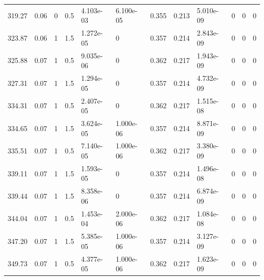 \documentclass[preview]{standalone}
\begin{document}
{{{\begin{tabular}{L{1.2cm}C{1.2cm} C{0.3cm}C{0.5cm} C{1.4cm}C{1.4cm} C{1.4cm}C{1.4cm} C{1.6cm}C{1.6cm} C{1.6cm}C{1.6cm}}
  319.27  &  0.06  & 0     & 0.5 &  4.103e-03  & 6.100e-05  &  0.355&   0.213& 5.010e-09 & 0   &  0 & 0  \\ 
  323.87  &  0.06  & 1     & 1.5 &  1.272e-05  & 0  &  0.357&   0.214& 2.843e-09 & 0   &  0 & 0  \\ 
  325.88  &  0.07  & 1     & 0.5 &  9.035e-06  & 0  &  0.362&   0.217& 1.943e-09 & 0   &  0 & 0  \\ 
  327.31  &  0.07  & 1     & 1.5 &  1.294e-05  & 0  &  0.357&   0.214& 4.732e-09 & 0   &  0 & 0  \\ 
  334.31  &  0.07  & 1     & 0.5 &  2.407e-05  & 0  &  0.362&   0.217& 1.515e-08 & 0   &  0 & 0  \\ 
  334.65  &  0.07  & 1     & 1.5 &  3.624e-05  & 1.000e-06  &  0.357&   0.214& 8.871e-09 & 0   &  0 & 0  \\ 
  335.51  &  0.07  & 1     & 0.5 &  7.140e-05  & 1.000e-06  &  0.362&   0.217& 3.380e-09 & 0   &  0 & 0  \\ 
  339.11  &  0.07  & 1     & 1.5 &  1.593e-05  & 0  &  0.357&   0.214& 1.496e-08 & 0   &  0 & 0  \\ 
  339.44  &  0.07  & 1     & 1.5 &  8.358e-06  & 0  &  0.357&   0.214& 6.874e-09 & 0   &  0 & 0  \\ 
  344.04  &  0.07  & 1     & 0.5 &  1.453e-04  & 2.000e-06  &  0.362&   0.217& 1.084e-08 & 0   &  0 & 0  \\ 
  347.20  &  0.07  & 1     & 1.5 &  5.385e-05  & 1.000e-06  &  0.357&   0.214& 3.127e-09 & 0   &  0 & 0  \\ 
  349.73  &  0.07  & 1     & 0.5 &  4.377e-05  & 1.000e-06  &  0.362&   0.217& 1.623e-09 & 0   &  0 & 0  \\ 
\hline 
\end{tabular} 

}}}
\end{document}
